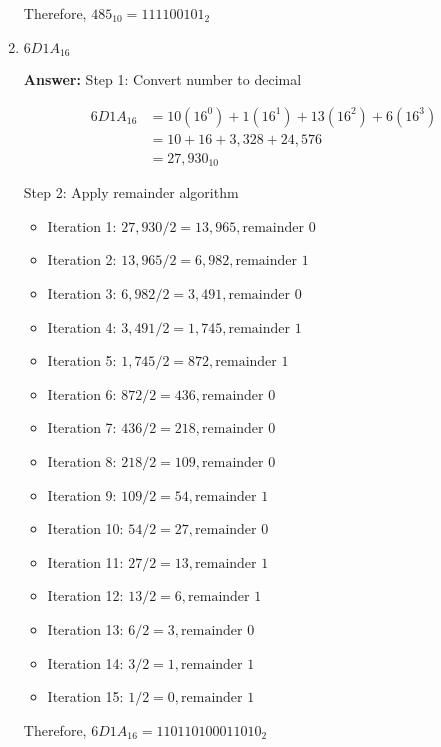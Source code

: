 \documentclass[12pt]{extreport}
\newcommand{\answer}[0]{\medskip \textbf{Answer:} \medskip}
\begin{document}
\begin{enumerate}
        Therefore, \( 485_{10} = 111100101_{2} \)

    \item \( 6D1A_{16} \)
    
        \answer
        Step 1: Convert number to decimal

        \begin{align*}
            6D1A_{16} &= 10(16^{0}) + 1(16^{1}) + 13(16^{2}) + 6(16^{3}) \\
                      &= 10 + 16 + 3,328 + 24,576 \\
                      &= 27,930_{10}
        \end{align*}

        Step 2: Apply remainder algorithm

        \begin{itemize}
            \item Iteration 1: \( 27,930 / 2 = 13,965, \text{remainder } 0 \)
            \item Iteration 2: \( 13,965 / 2 = 6,982, \text{remainder } 1 \)
            \item Iteration 3: \( 6,982 / 2 = 3,491, \text{remainder } 0 \)
            \item Iteration 4: \( 3,491 / 2 = 1,745, \text{remainder } 1 \)
            \item Iteration 5: \( 1,745 / 2 = 872, \text{remainder } 1 \)
            \item Iteration 6: \( 872 / 2 = 436, \text{remainder } 0 \)
            \item Iteration 7: \( 436 / 2 = 218, \text{remainder } 0 \)
            \item Iteration 8: \( 218 / 2 = 109, \text{remainder } 0 \)
            \item Iteration 9: \( 109 / 2 = 54, \text{remainder } 1 \)
            \item Iteration 10: \( 54 / 2 = 27, \text{remainder } 0 \)
            \item Iteration 11: \( 27 / 2 = 13, \text{remainder } 1 \)
            \item Iteration 12: \( 13 / 2 = 6, \text{remainder } 1 \)
            \item Iteration 13: \( 6 / 2 = 3, \text{remainder } 0 \)
            \item Iteration 14: \( 3 / 2 = 1, \text{remainder } 1 \)
            \item Iteration 15: \( 1 / 2 = 0, \text{remainder } 1 \)        
        \end{itemize}

        Therefore, \( 6D1A_{16} = 110110100011010_{2} \)

\end{enumerate}
\end{document}
